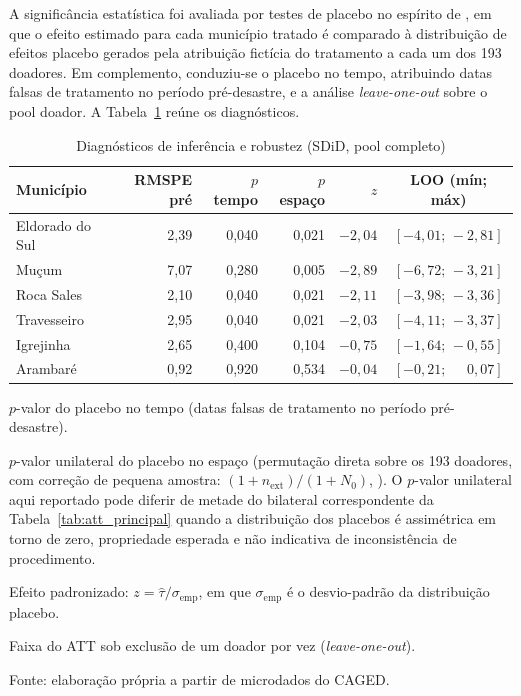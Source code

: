\documentclass[a4paper,12pt]{article}
\begin{document}
A significância estatística foi avaliada por testes de placebo no espírito
de , em que o efeito estimado para cada município
tratado é comparado à distribuição de efeitos placebo gerados pela atribuição
fictícia do tratamento a cada um dos 193 doadores. Em complemento, conduziu-se
o placebo no tempo, atribuindo datas falsas de tratamento no período
pré-desastre, e a análise \textit{leave-one-out} sobre o pool doador. A
Tabela~\ref{tab:robustez} reúne os diagnósticos.

\begin{table}[htbp]
\centering
\caption{Diagnósticos de inferência e robustez (SDiD, pool completo)}
\label{tab:robustez}
\begin{threeparttable}
\small
\begin{tabular}{l r r r r c}
\toprule
Município & RMSPE pré & $p$ tempo\tnote{a} & $p$ espaço\tnote{b} & $z$\tnote{c} & LOO (mín; máx)\tnote{d} \\
\midrule
Eldorado do Sul & 2,39 & 0,040 & 0,021 & $-2{,}04$ & $[-4{,}01;\,-2{,}81]$ \\
Mu\c{c}um        & 7,07 & 0,280 & 0,005 & $-2{,}89$ & $[-6{,}72;\,-3{,}21]$ \\
Roca Sales      & 2,10 & 0,040 & 0,021 & $-2{,}11$ & $[-3{,}98;\,-3{,}36]$ \\
Travesseiro     & 2,95 & 0,040 & 0,021 & $-2{,}03$ & $[-4{,}11;\,-3{,}37]$ \\
Igrejinha       & 2,65 & 0,400 & 0,104 & $-0{,}75$ & $[-1{,}64;\,-0{,}55]$ \\
Arambaré        & 0,92 & 0,920 & 0,534 & $-0{,}04$ & $[-0{,}21;\,\phantom{-}0{,}07]$ \\
\bottomrule
\end{tabular}
\begin{tablenotes}[flushleft]
\footnotesize
\item[a] $p$-valor do placebo no tempo (datas falsas de tratamento no período pré-desastre).
\item[b] $p$-valor unilateral do placebo no espaço (permutação direta sobre os 193 doadores, com correção de pequena amostra: $(1 + n_{\text{ext}})/(1 + N_0)$, \citeauthor{north2002}). O $p$-valor unilateral aqui reportado pode diferir de metade do bilateral correspondente da Tabela~\ref{tab:att_principal} quando a distribuição dos placebos é assimétrica em torno de zero, propriedade esperada e não indicativa de inconsistência de procedimento.
\item[c] Efeito padronizado: $z = \hat{\tau} / \sigma_{\text{emp}}$, em que $\sigma_{\text{emp}}$ é o desvio-padrão da distribuição placebo.
\item[d] Faixa do ATT sob exclusão de um doador por vez (\textit{leave-one-out}).
\item Fonte: elaboração própria a partir de microdados do CAGED.
\end{tablenotes}
\end{threeparttable}
\end{table}
\end{document}
